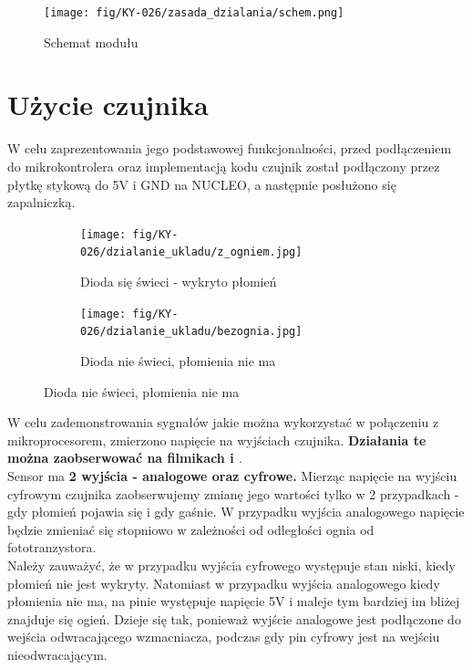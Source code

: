 \documentclass[11pt, a4paper]{article}
\begin{document}
\vspace{0.5cm}
\begin{figure}[h]
  \centering
  \texttt{[image: fig/KY-026/zasada\_dzialania/schem.png]}
    \caption{Schemat modułu}
    \label{sch}
\end{figure}



\newpage
\section{Użycie czujnika}
W celu zaprezentowania jego podstawowej funkcjonalności, przed podłączeniem do mikrokontrolera oraz implementacją kodu czujnik został podłączony przez płytkę stykową do 5V i GND na NUCLEO, a następnie posłużono się zapalniczką. 

\begin{figure}[h]
\centering
\begin{subfigure}{.4\textwidth}
  \centering
  \texttt{[image: fig/KY-026/dzialanie\_ukladu/z\_ogniem.jpg]}
  \caption{Dioda się świeci - wykryto płomień}
  \label{fig:12pd}
\end{subfigure}
\begin{subfigure}{.4\textwidth}
  \centering
  \texttt{[image: fig/KY-026/dzialanie\_ukladu/bezognia.jpg]}
  \caption{Dioda nie świeci, płomienia nie ma}
  \label{fig:sub2}
\end{subfigure}
\label{fig:12pu}
\end{figure}
W celu zademonstrowania sygnałów jakie można wykorzystać w połączeniu z mikroprocesorem, zmierzono napięcie na wyjściach czujnika. \textbf{Działania te można zaobserwować na filmikach \cite{c} i \cite{a}}. \\
Sensor ma \textbf{2 wyjścia - analogowe oraz cyfrowe.} Mierząc napięcie na wyjściu cyfrowym czujnika zaobserwujemy zmianę jego wartości tylko w 2 przypadkach - gdy płomień pojawia się i gdy gaśnie. W przypadku wyjścia analogowego napięcie będzie zmieniać się stopniowo w zależności od odległości ognia od fototranzystora.  \\
Należy zauważyć, że w przypadku wyjścia cyfrowego występuje stan niski, kiedy płomień nie jest wykryty. Natomiast w przypadku wyjścia analogowego kiedy płomienia nie ma, na pinie występuje napięcie 5V i maleje tym bardziej im bliżej znajduje się ogień. Dzieje się tak, ponieważ wyjście analogowe jest podłączone do wejścia odwracającego wzmacniacza, podczas gdy pin cyfrowy jest na wejściu nieodwracającym. 
\end{document}
